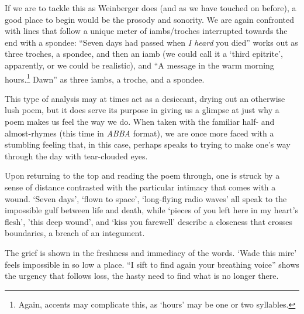 \documentclass[12pt,oneside]{memoir}
\begin{document}
If we are to tackle this as Weinberger does (and as we have touched on before), a good place to begin would be the prosody and sonority. We are again confronted with lines that follow a unique meter of iambs/troches interrupted towards the end with a spondee: ``Seven days had passed when \emph{I heard} you died'' works out as three troches, a spondee, and then an iamb (we could call it a `third epitrite', apparently, or we could be realistic), and ``A message in the warm morning hours.\footnote{Again, accents may complicate this, as `hours' may be one or two syllables.} Dawn'' as three iambs, a troche, and a spondee. 

This type of analysis may at times act as a desiccant, drying out an otherwise lush poem, but it does serve its purpose in giving us a glimpse at just why a poem makes us feel the way we do. When taken with the familiar half- and almost-rhymes (this time in \emph{ABBA} format), we are once more faced with a stumbling feeling that, in this case, perhaps speaks to trying to make one's way through the day with tear-clouded eyes.

Upon returning to the top and reading the poem through, one is struck by a sense of distance contrasted with the particular intimacy that comes with a wound. `Seven days', `flown to space', `long-flying radio waves' all speak to the impossible gulf between life and death, while `pieces of you left here in my heart's flesh', 'this deep wound', and `kiss you farewell' describe a closeness that crosses boundaries, a breach of an integument.

The grief is shown in the freshness and immediacy of the words. `Wade this mire' feels impossible in so low a place. ``I sift to find again your breathing voice'' shows the urgency that follows loss, the hasty need to find what is no longer there.
\end{document}

